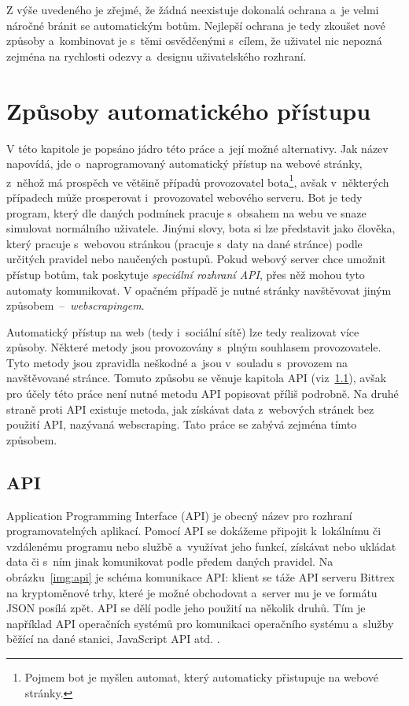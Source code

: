 \bigskip

Z výše uvedeného je zřejmé, že žádná neexistuje dokonalá ochrana a~je velmi náročné bránit se automatickým botům. Nejlepší ochrana je tedy zkoušet nové způsoby a~kombinovat je s~těmi osvědčenými s~cílem, že uživatel nic nepozná zejména na rychlosti odezvy a~designu uživatelského rozhraní. 

\chapter{Způsoby automatického přístupu}
\label{chap:auto_approach_to_web}
V této kapitole je popsáno jádro této práce a~její možné alternativy. Jak název napovídá, jde o~naprogramovaný automatický přístup na webové stránky, z~něhož má prospěch ve většině případů provozovatel bota\footnote{Pojmem bot je myšlen automat, který automaticky přistupuje na webové stránky.}, avšak v~některých případech může prosperovat i~provozovatel webového serveru. Bot je tedy program, který dle daných podmínek pracuje s~obsahem na webu ve snaze simulovat normálního uživatele. Jinými slovy, bota si lze představit jako člověka, který pracuje s~webovou stránkou (pracuje s~daty na dané stránce) podle určitých pravidel nebo naučených postupů. Pokud webový server chce umožnit přístup botům, tak poskytuje \textit{speciální rozhraní API}, přes něž mohou tyto automaty komunikovat. V opačném případě je nutné stránky navštěvovat jiným způsobem~--~\textit{webscrapingem}.

Automatický přístup na web (tedy i~sociální sítě) lze tedy realizovat více způsoby. Některé metody jsou provozovány s~plným souhlasem provozovatele. Tyto metody jsou zpravidla neškodné a~jsou v~souladu s~provozem na navštěvované stránce. Tomuto způsobu se věnuje kapitola API (viz~\ref{sec:api}), avšak pro účely této práce není nutné metodu API popisovat příliš podrobně. Na druhé straně proti API existuje metoda, jak získávat data z~webových stránek bez použití API, nazývaná webscraping. Tato práce se zabývá zejména tímto způsobem.

\section{API}
\label{sec:api}
Application Programming Interface (API) je obecný název pro rozhraní programovatelných aplikací. Pomocí API se dokážeme připojit k~lokálnímu či vzdálenému programu nebo službě a~využívat jeho funkcí, získávat nebo ukládat data či s~ním jinak komunikovat podle předem daných pravidel. Na obrázku~\ref{img:api} je schéma komunikace API: klient se táže API serveru Bittrex na kryptoměnové trhy, které je možné obchodovat a~server mu je ve formátu JSON posílá zpět. API se dělí podle jeho použití na několik druhů. Tím je například API operačních systémů pro komunikaci operačního systému a~služby běžící na dané stanici, JavaScript API atd. \cite{bib:API_introduction}. 

